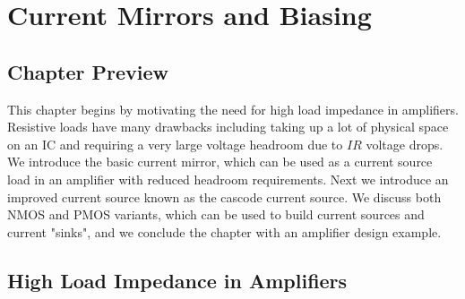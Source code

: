 \chapter{Current Mirrors and Biasing}
\label{ch:ch13_mirrors_biasing}
\graphicspath{{./figs_current_source/}}
\section{Chapter Preview}
This chapter begins by motivating the need for high load impedance in amplifiers.  Resistive loads have many drawbacks including taking up a lot of physical space on an IC and requiring a very large voltage headroom due to $IR$ voltage drops.  We introduce the basic current mirror, which can be used as a current source load in an amplifier with reduced headroom requirements.  Next we introduce an improved current source known as the cascode current source.  We discuss both NMOS and PMOS variants, which can be used to build current sources and current "sinks", and we conclude the chapter with an amplifier design example.
\section{High Load Impedance in Amplifiers}
